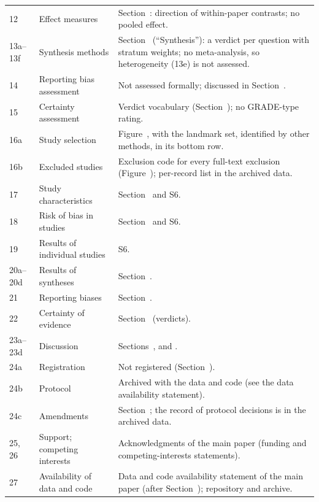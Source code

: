 \documentclass[acmsmall,screen]{acmart}
\makeatletter
\newcommand{\Mref}[1]{\@ifundefined{mr@#1}{\textbf{??}}{\csname mr@#1\endcsname}}
\makeatother
\begin{document}
{\begin{longtable}{@{}p{1.2cm}p{3.6cm}p{7.8cm}@{}}
12 & Effect measures & Section~\Mref{sec:rq}: direction of within-paper contrasts; no pooled effect. \\
13a--13f & Synthesis methods & Section~\Mref{sec:method-extraction} (``Synthesis''): a verdict per question with stratum weights; no meta-analysis, so heterogeneity (13e) is not assessed. \\
14 & Reporting bias assessment & Not assessed formally; discussed in Section~\Mref{sec:limits}. \\
15 & Certainty assessment & Verdict vocabulary (Section~\Mref{sec:method-extraction}); no GRADE-type rating. \\
16a & Study selection & Figure~\Mref{fig:prisma}, with the landmark set, identified by other methods, in its bottom row. \\
16b & Excluded studies & Exclusion code for every full-text exclusion (Figure~\Mref{fig:prisma}); per-record list in the archived data. \\
17 & Study characteristics & Section~\Mref{sec:rq} and S6. \\
18 & Risk of bias in studies & Section~\Mref{sec:rq} and S6. \\
19 & Results of individual studies & S6. \\
20a--20d & Results of syntheses & Section~\Mref{sec:rq}. \\
21 & Reporting biases & Section~\Mref{sec:limits}. \\
22 & Certainty of evidence & Section~\Mref{sec:rq} (verdicts). \\
23a--23d & Discussion & Sections~\Mref{sec:open}, \Mref{sec:limits} and \Mref{sec:conclusion}. \\
24a & Registration & Not registered (Section~\Mref{sec:method-design}). \\
24b & Protocol & Archived with the data and code (see the data availability statement). \\
24c & Amendments & Section~\Mref{sec:method-deviations}; the record of protocol decisions is in the archived data. \\
25, 26 & Support; competing interests & Acknowledgments of the main paper (funding and competing-interests statements). \\
27 & Availability of data and code & Data and code availability statement of the main paper (after Section~\Mref{sec:conclusion}); repository and archive. \\
\bottomrule
\end{longtable}
}
\end{document}
